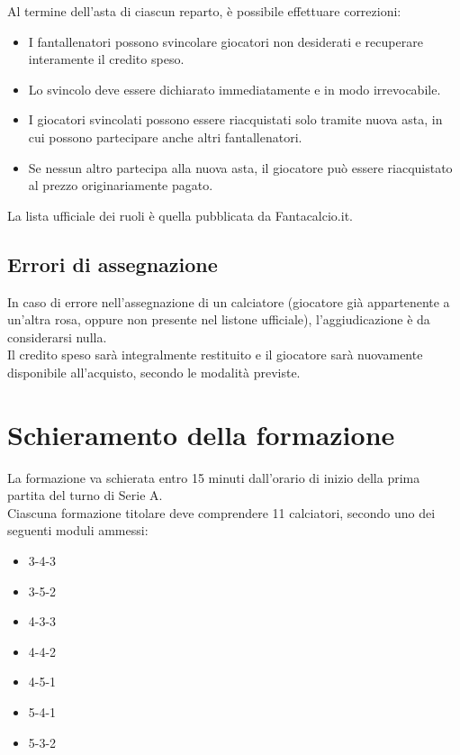 Al termine dell’asta di ciascun reparto, è possibile effettuare correzioni:

\begin{itemize}
  \item I fantallenatori possono svincolare giocatori non desiderati e recuperare interamente il credito speso.
  \item Lo svincolo deve essere dichiarato immediatamente e in modo irrevocabile.
  \item I giocatori svincolati possono essere riacquistati solo tramite nuova asta, in cui possono partecipare anche altri fantallenatori.
  \item Se nessun altro partecipa alla nuova asta, il giocatore può essere riacquistato al prezzo originariamente pagato.
\end{itemize}

\noindent
La lista ufficiale dei ruoli è quella pubblicata da Fantacalcio.it.

\subsection{Errori di assegnazione}
\label{art:4.3.6}

In caso di errore nell’assegnazione di un calciatore (giocatore già appartenente a un’altra rosa, oppure non presente nel listone ufficiale), l’aggiudicazione è da considerarsi nulla.\\
Il credito speso sarà integralmente restituito e il giocatore sarà nuovamente disponibile all’acquisto, secondo le modalità previste.

\section{Schieramento della formazione}
\label{art:4.4}

La formazione va schierata entro 15 minuti dall’orario di inizio della prima partita del turno di Serie A.\\

Ciascuna formazione titolare deve comprendere 11 calciatori, secondo uno dei seguenti moduli ammessi:

\begin{itemize}
  \item 3-4-3
  \item 3-5-2
  \item 4-3-3
  \item 4-4-2
  \item 4-5-1
  \item 5-4-1
  \item 5-3-2
\end{itemize}


